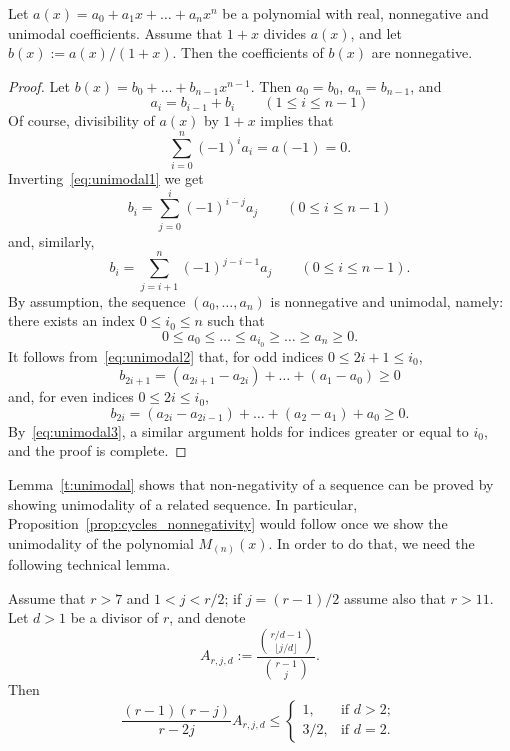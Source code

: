 \documentclass[ALCO,published]{cedram}
\begin{document}
\begin{lemma}\label{t:unimodal}
    Let $a(x) = a_0 + a_1 x + \ldots + a_n x^n$ be a polynomial with real, nonnegative and unimodal coefficients.
    Assume that $1+x$ divides $a(x)$, and let $b(x) := a(x)/(1+x)$.
    Then the coefficients of $b(x)$ are nonnegative.
\end{lemma}
	
\begin{proof}
    Let $b(x) = b_0 + \ldots + b_{n-1} x^{n-1}$.
    Then $a_0 = b_0$, $a_n = b_{n-1}$, and
    \begin{equation}\label{eq:unimodal1}
        a_i = b_{i-1} + b_i 
        \qquad (1 \le i \le n-1)
    \end{equation}
    Of course, divisibility of $a(x)$ by $1+x$ implies that
    \[
        \sum_{i=0}^{n} (-1)^i a_i = a(-1) = 0.
    \]
    Inverting~\eqref{eq:unimodal1} we get
    \begin{equation}\label{eq:unimodal2}
        b_i = \sum_{j=0}^i (-1)^{i-j} a_j
        \qquad (0 \le i \le n-1)
    \end{equation}
    and, similarly,
    \begin{equation}\label{eq:unimodal3}
        b_i = \sum_{j=i+1}^n (-1)^{j-i-1} a_j
        \qquad (0 \le i \le n-1).
    \end{equation}
    By assumption, the sequence $(a_0, \ldots, a_n)$ is nonnegative and unimodal, namely: 
    there exists an index $0 \le i_0 \le n$ such that
    \[
        0 \le a_0 \le \ldots \le a_{i_0} \ge \ldots \ge a_n \ge 0.
    \]
    It follows from~\eqref{eq:unimodal2} that, for odd indices $0 \le 2i+1 \le i_0$,
    \[
        b_{2i+1} = (a_{2i+1} - a_{2i}) + \ldots + (a_1 - a_0) \ge 0
    \]
    and, for even indices $0 \le 2i \le i_0$,
    \[
        b_{2i} = (a_{2i} - a_{2i-1}) + \ldots + (a_2 - a_1) + a_0 \ge 0.
    \]
    By~\eqref{eq:unimodal3}, a similar argument holds for 
    indices greater or equal to $i_0$, and the proof is complete.
\end{proof}
	
Lemma~\ref{t:unimodal} shows that non-negativity of a sequence can be proved by showing unimodality of a related sequence. In particular, Proposition~\ref{prop:cycles_nonnegativity} would follow once we show the unimodality of the polynomial $M_{(n)}(x)$.
In order to do that, we need the following technical lemma.

\begin{lemma}\label{lem:binomial_approx}
    Assume that $r > 7$ and $1 < j < r/2$;
    if $j = (r-1)/2$ assume also that $r > 11$.
    Let $d > 1$ be a divisor of $r$, and denote
	\[
	   A_{r,j,d} 
	   := \frac{\displaystyle\binom{r/d - 1} {\lfloor j/d \rfloor}} {\displaystyle\binom{r-1}{j}}.
	\]
	Then
	\[
	\frac{(r-1)(r-j)}{r-2j} A_{r,j,d} \le 
	\begin{cases}
	        1, &\text{if } d>2; \\
	        3/2, &\text{if } d=2.
	\end{cases}
	\]
\end{lemma}
	
\end{document}
